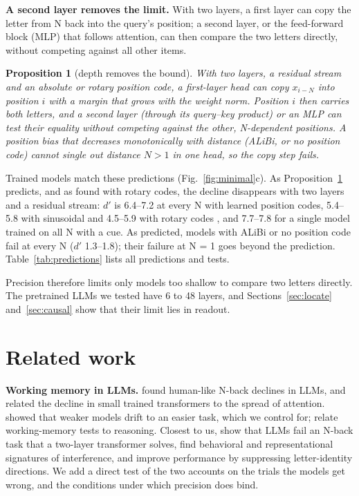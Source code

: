 \documentclass{article}
\newtheorem{proposition}{Proposition}
\newcommand{\dprime}{$d'$}
\begin{document}
\textbf{A second layer removes the limit.} With two layers, a first layer can copy the letter from N back into the query's position; a second layer, or the feed-forward block (MLP) that follows attention, can then compare the two letters directly, without competing against all other items.

\begin{proposition}[depth removes the bound]\label{prop:depth}
With two layers, a residual stream and an absolute or rotary position code, a first-layer head can copy $x_{i-N}$ into position $i$ with a margin that grows with the weight norm. Position $i$ then carries both letters, and a second layer (through its query--key product) or an MLP can test their equality without competing against the other, N-dependent positions. A position bias that decreases monotonically with distance (ALiBi, or no position code) cannot single out distance $N>1$ in one head, so the copy step fails.
\end{proposition}

Trained models match these predictions (Fig.~\ref{fig:minimal}c). As Proposition~\ref{prop:depth} predicts, and as \citet{xiong2026superposition} found with rotary codes, the decline disappears with two layers and a residual stream: \dprime{} is 6.4--7.2 at every N with learned position codes, 5.4--5.8 with sinusoidal and 4.5--5.9 with rotary codes \citep{su2021roformer}, and 7.7--7.8 for a single model trained on all N with a cue. As predicted, models with ALiBi \citep{press2022alibi} or no position code fail at every N (\dprime{} 1.3--1.8); their failure at N = 1 goes beyond the prediction. Table~\ref{tab:predictions} lists all predictions and tests.

Precision therefore limits only models too shallow to compare two letters directly. The pretrained LLMs we tested have 6 to 48 layers, and Sections~\ref{sec:locate} and~\ref{sec:causal} show that their limit lies in readout.



\section{Related work}
\label{sec:related}

\textbf{Working memory in LLMs.} \citet{gong2024chatgpt} found human-like N-back declines in LLMs, and \citet{gong2024selfattention} related the decline in small trained transformers to the spread of attention. \citet{hu2025nback} showed that weaker models drift to an easier task, which we control for; \citet{zhang2024wmreasoning} relate working-memory tests to reasoning. Closest to us, \citet{xiong2026superposition} show that LLMs fail an N-back task that a two-layer transformer solves, find behavioral and representational signatures of interference, and improve performance by suppressing letter-identity directions. We add a direct test of the two accounts on the trials the models get wrong, and the conditions under which precision does bind.
\end{document}
